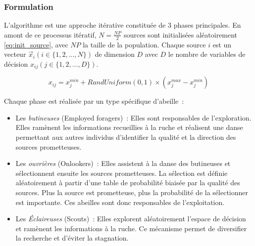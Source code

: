 \subsubsection{Formulation} %
\label{ssub:formulation}
L’algorithme  est une approche itérative constituée de 3 phases principales.
En amont de ce processus itératif, $N = \frac{NP}{2}$ sources sont initialisées
aléatoirement \eqref{eq:init_source}, avec $NP$ la taille de la population.
Chaque source $i$ est un vecteur $\vec{x}_{i}(i \in \{1, 2, \dotsc, N\})$ de dimension $D$
avec $D$ le nombre de variables de décision $x_{ij} (j \in \{1, 2, \dotsc, D\})$.

\begin{equation}\label{eq:init_source}
  x_{ij} = x_{j}^{min} + RandUniform(0, 1) \times (x_{j}^{max} - x_{j}^{min})
\end{equation}

\noindent Chaque phase est réalisée par un type spécifique d’abeille~:
\begin{itemize}
  \item Les \textit{butineuses} (Employed foragers)~: Elles sont responsables de l’exploration.
        Elles ramènent les informations recueillies à la ruche et réalisent une danse
        permettant aux autres individus d’identifier la qualité et la direction des
        sources prometteuses.
  \item Les \textit{ouvrières} (Onlookers)~: Elles assistent à la danse des butineuses
        et sélectionnent ensuite les sources prometteuses. La sélection est définie
        aléatoirement à partir d’une table de probabilité biaisée par la qualité des sources.
        Plus la source est prometteuse, plus la probabilité de la sélectionner est importante.
        Ces abeilles sont donc responsables de l’exploitation.
  \item Les \textit{Éclaireuses} (Scouts)~: Elles explorent aléatoirement l’espace
        de décision et ramènent les informations à la ruche. Ce mécanisme
        permet de diversifier la recherche et d’éviter la stagnation.
\end{itemize}

